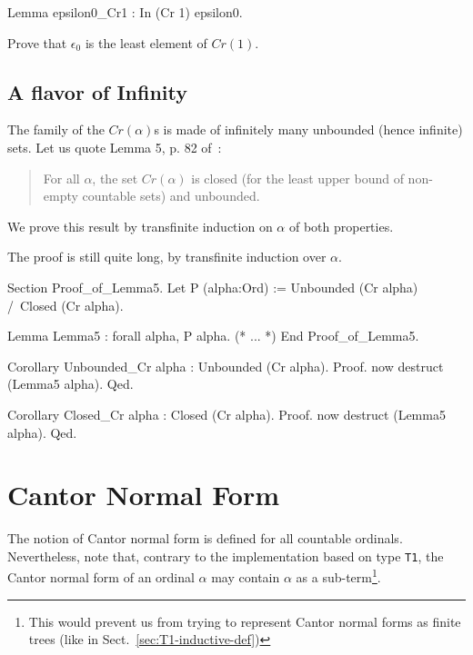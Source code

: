 {\begin{Coqsrc}
Lemma epsilon0_Cr1 : In (Cr 1) epsilon0.
\end{Coqsrc}


\begin{exercise}
 Prove that $\epsilon_0$ is the least element of $\textit{Cr}(1)$.
\end{exercise}


\subsection{A flavor of Infinity}



The family of the $\textit{Cr}(\alpha)$s is made of infinitely many unbounded (hence infinite) sets.
Let us quote Lemma 5, p. 82  of~\cite{schutte}:
\begin{quote}
  For all $\alpha$, the set $\textit{Cr}(\alpha)$ is closed (for the least upper bound of non-empty countable sets) and unbounded.
\end{quote}

We prove this result by transfinite induction on $\alpha$ of both properties.

The proof is still quite long, by transfinite induction over $\alpha$.



\begin{Coqsrc}
Section Proof_of_Lemma5.
  Let P (alpha:Ord) := Unbounded (Cr alpha) /\ Closed (Cr alpha).
 
 Lemma Lemma5 : forall alpha, P alpha.
(* ... *)
 End Proof_of_Lemma5.

Corollary Unbounded_Cr alpha : Unbounded (Cr alpha).
Proof.
  now destruct (Lemma5 alpha).
Qed.

Corollary Closed_Cr alpha : Closed (Cr alpha).
Proof.
  now destruct (Lemma5 alpha).
Qed.
\end{Coqsrc}

\section{Cantor Normal Form}

The notion of Cantor normal form is defined for all countable ordinals.
Nevertheless, note that, contrary to the implementation based on type \texttt{T1},
the Cantor normal form of an ordinal $\alpha$ may contain $\alpha$ as a 
sub-term\footnote{This would prevent us from trying to represent Cantor normal forms as finite trees (like in Sect.~\ref{sec:T1-inductive-def})}.


}
